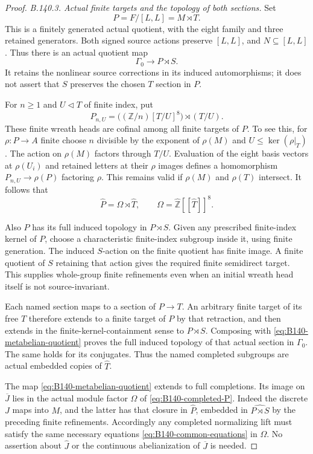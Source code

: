 \begin{proof}
\emph{B.140.3. Actual finite targets and the topology of both sections.}
Set
\[
 P=F/[L,L]=M\rtimes T .
\]
This is a finitely generated actual quotient, with the eight
family and three retained generators. Both signed source
actions preserve $[L,L]$, and $N\subseteq[L,L]$.
Thus there is an actual quotient map
\begin{equation}\label{eq:B140-metabelian-quotient}
 \Gamma_0\longrightarrow P\rtimes S .
\end{equation}
It retains the nonlinear source corrections in its induced
automorphisms; it does not assert that $S$ preserves the
chosen $T$ section in $P$.

For $n\geq1$ and $U\triangleleft T$ of finite index, put
\[
 P_{n,U}=\bigl((\mathbb Z/n)[T/U]^8\bigr)\rtimes(T/U).
\]
These finite wreath heads are cofinal among all finite
targets of $P$. To see this, for $\rho:P\to A$ finite
choose $n$ divisible by the exponent of $\rho(M)$ and
$U\leq\ker(\rho|_T)$. The action on $\rho(M)$ factors
through $T/U$. Evaluation of the eight basis vectors
at $\rho(U_i)$ and retained letters at their $\rho$ images
defines a homomorphism $P_{n,U}\to\rho(P)$ factoring $\rho$.
This remains valid if $\rho(M)$ and $\rho(T)$ intersect.
It follows that
\begin{equation}\label{eq:B140-completed-P}
 \widehat P=\Omega\rtimes\widehat T,\qquad
 \Omega=\widehat{\mathbb Z}[[\widehat T]]^8 .
\end{equation}

Also $P$ has its full induced topology in $P\rtimes S$.
Given any prescribed finite-index kernel of $P$, choose
a characteristic finite-index subgroup inside it, using
finite generation. The induced $S$-action on the finite
quotient has finite image. A finite quotient of $S$
retaining that action gives the required finite
semidirect target. This supplies whole-group finite
refinements even when an initial wreath head itself is
not source-invariant.

Each named section maps to a section of $P\to T$.
An arbitrary finite target of its free $T$ therefore
extends to a finite target of $P$ by that retraction,
and then extends in the finite-kernel-containment sense
to $P\rtimes S$. Composing with
\eqref{eq:B140-metabelian-quotient} proves the full
induced topology of that actual section in $\Gamma_0$.
The same holds for its conjugates.
Thus the named completed subgroups are actual embedded
copies of $\widehat T$.

The map \eqref{eq:B140-metabelian-quotient} extends to full
completions. Its image on $\overline J$ lies in the
actual module factor $\Omega$ of \eqref{eq:B140-completed-P}.
Indeed the discrete $J$ maps into $M$, and the latter
has that closure in $\widehat P$, embedded in
$\widehat{P\rtimes S}$ by the preceding finite refinements.
Accordingly any completed normalizing lift must satisfy
the same necessary equations
\eqref{eq:B140-common-equations} in $\Omega$.
No assertion about $\widehat J$ or the continuous
abelianization of $\overline J$ is needed.


\end{proof}
